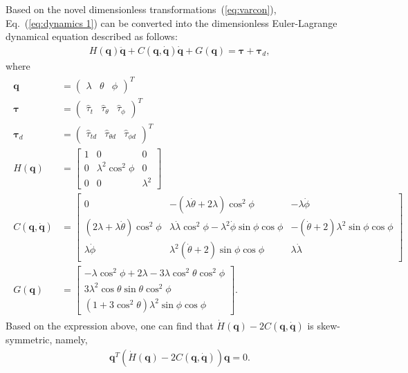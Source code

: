 \documentclass[3p]{elsarticle}
\theoremstyle{plain}
\theoremstyle{remark}
\begin{document}
Based on the novel dimensionless transformations~(\ref{eq:varcon}), Eq.~(\ref{eq:dynamics 1}) can be converted into the dimensionless Euler-Lagrange dynamical equation described as follows:
\begin{align}
H(\bm q)\ddot {\bm q}+C(\bm q,\dot{\bm q})\dot{\bm q}+G(\bm q) = \bm\tau+\bm\tau_d,\label{eq:dynamic model}
\end{align}
where
\begin{align}
\begin{split}
\bm q&= \begin{pmatrix}\lambda&\theta&\phi\end{pmatrix}^T\\
\bm \tau&=\begin{pmatrix}\hat\tau_t&\hat\tau_\theta&\hat\tau_\phi\end{pmatrix}^T\\
\bm\tau_d&=\begin{pmatrix}\hat\tau_{td}&\hat\tau_{\theta d}&\hat\tau_{\phi d}\end{pmatrix}^T\\
H(\bm q) &= \begin{bmatrix}1 &0&0\\0 &\lambda^2\cos^2\phi&0\\0&0&\lambda^2\end{bmatrix}\\
C(\bm q,\dot{\bm q}) &=\begin{bmatrix}0 &-(\lambda\dot \theta+2\lambda)\cos^2\phi&-\lambda\dot\phi\\(2\lambda+\lambda\dot \theta)\cos^2\phi&\lambda\dot \lambda\cos^2\phi-\lambda^2\dot\phi\sin\phi\cos\phi&-(\dot\theta+2)\lambda^2\sin\phi\cos\phi\\ \lambda\dot\phi&\lambda^2(\dot\theta+2)\sin\phi\cos\phi&\lambda\dot \lambda\end{bmatrix}\\
G(\bm q) &=\begin{bmatrix}-\lambda\cos^2\phi+2\lambda-3\lambda\cos ^2\theta\cos^2\phi\\3\lambda^2\cos\theta\sin\theta\cos^2\phi\\(1+3\cos^2\theta)\lambda^2\sin\phi\cos\phi\end{bmatrix}.
\end{split}
\end{align}
Based on the expression above, one can find that $\dot H(\bm q) - 2C(\bm q,\dot{\bm q})$ is skew-symmetric, namely,
\begin{align}
\bm q^T(\dot H(\bm q) - 2C(\bm q,\dot{\bm q}))\bm q = 0.
\end{align}
\end{document}
